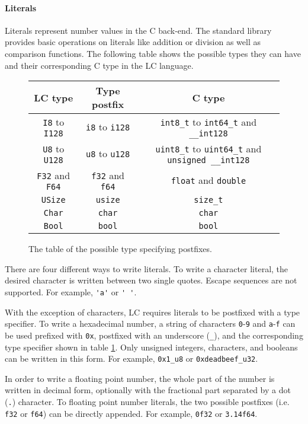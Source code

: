 \documentclass[12pt]{article}
\begin{document}
\paragraph{Literals} Literals represent number values in the C back-end. The
standard library provides basic operations on literals like addition or division
as well as comparison functions. The following table shows the possible types
they can have and their corresponding C type in the LC language.
\begin{figure}[ht]
\begin{center}
\begin{tabular}{c c c}
    LC type & Type postfix & C type \\
    \hline
    \verb$I8$ to \verb$I128$ & \verb$i8$ to \verb$i128$ & \verb$int8_t$ to
    \verb$int64_t$ and \verb$__int128$ \\
    \verb$U8$ to \verb$U128$ & \verb$u8$ to \verb$u128$ & \verb$uint8_t$ to
    \verb$uint64_t$ and \verb$unsigned __int128$ \\
    \verb$F32$ and \verb$F64$ & \verb$f32$ and \verb$f64$ & \verb$float$ and
    \verb$double$ \\
    \verb$USize$ & \verb$usize$ & \verb$size_t$ \\
    \verb$Char$ & \verb$char$ & \verb$char$ \\
    \verb$Bool$ & \verb$bool$ & \verb$bool$
\end{tabular}
\end{center}
\caption{The table of the possible type specifying postfixes.}
\label{fig:type-specifying-postfix-table}
\end{figure}
There are four different ways to write literals. To write a character literal,
the desired character is written between two single quotes. Escape sequences are
not supported. For example, \verb$'a'$ or \verb$' '$.

With the exception of characters, LC requires literals to be postfixed with a
type specifier. To write a hexadecimal number, a string of characters
\verb$0$-\verb$9$ and \verb$a$-\verb$f$ can be used prefixed with \verb$0x$,
postfixed with an underscore (\verb$_$), and the corresponding type specifier
shown in table \ref{fig:type-specifying-postfix-table}. Only unsigned integers,
characters, and booleans can be written in this form. For example, \verb$0x1_u8$
or \verb$0xdeadbeef_u32$.

In order to write a floating point number, the whole part of the number is
written in decimal form, optionally with the fractional part separated by a dot
(\verb$.$) character. To floating point number literals, the two possible
postfixes (i.e. \verb$f32$ or \verb$f64$) can be directly appended. For example,
\verb$0f32$ or \verb$3.14f64$.
\end{document}
